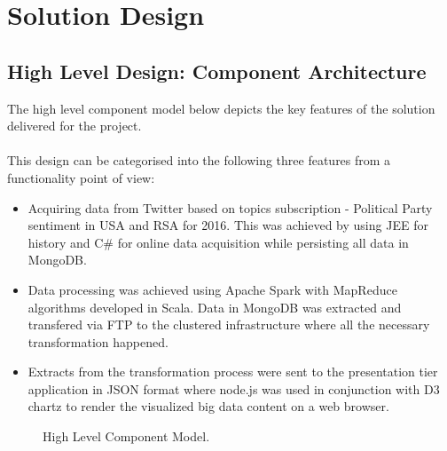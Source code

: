 \documentclass[12pt]{article} %
\begin{document}
	
	
	

	
	
	

	
	
	\section{Solution Design}
		
	\subsection{High Level Design: Component Architecture}
	The high level component model below depicts the key features of the solution delivered for the project.
	\\
	\\
	This design can be categorised into the following three features from a functionality point of view:
	
		\begin{itemize}
			\item Acquiring data from Twitter based on topics subscription - Political Party sentiment in USA and RSA for 2016. This was achieved by using JEE for history and C\# for online data acquisition while persisting all data in MongoDB.
			\item Data processing was achieved using Apache Spark with MapReduce algorithms developed in Scala. Data in MongoDB was extracted and transfered via FTP to the clustered infrastructure where all the necessary transformation happened.
			\item Extracts from the transformation process were sent to the presentation tier application in JSON format where node.js was used in conjunction with D3 chartz to render the visualized big data content on a web browser.
		\end{itemize}
	
	
		\begin{figure}[H] %
			\caption{High Level Component Model.}
			\label{fig:speciation}
		\end{figure}
	
\end{document}

